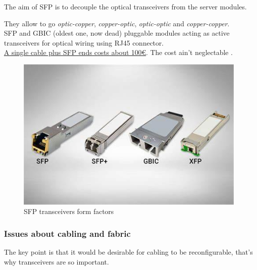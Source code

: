 \begin{paracol}{2}
   
   The aim of SFP is to decouple the optical transceivers from the server modules.

   They allow to go \textit{optic-copper}, \textit{copper-optic}, \textit{optic-optic} and \textit{copper-copper}.\\
   SFP and GBIC (oldest one, now dead) pluggable modules acting as active transceivers for optical wiring using RJ45 connector.\\
   \ul{A single cable plus SFP ends costs about 100€}.
   The cost ain't neglectable \smiley.


   \switchcolumn
   \colfill
   \begin{figure}[htbp]
      \centering
      \includegraphics{images/sfp.jpeg}
      \caption{SFP transceivers form factors}
      \label{fig:sfp}
   \end{figure}
   \colfill
\end{paracol}


\subsubsection{Issues about cabling and fabric}
The key point is that it would be desirable for cabling to be reconfigurable, that's why transceivers are so important.

